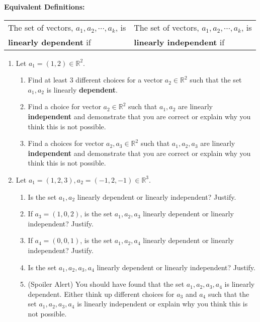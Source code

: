 \documentclass[11pt,fleqn]{article}
\begin{document}
\vfill

\noindent\textbf{Equivalent Definitions:}\\

\noindent\begin{tabularx}{\textwidth}{XX}
The set of vectors, $a_1,a_2, \cdots, a_k$, is 
& 
The set of vectors, $a_1,a_2, \cdots, a_k$, is \\
 \textbf{linearly dependent} if
 &
 \textbf{linearly independent} if\\
\end{tabularx}
\vspace{1in}
\newpage
\begin{enumerate}
\item Let $a_1=(1,2) \in \mathbb{R}^2.$
	\begin{enumerate}
	\item Find at least 3 different choices for a vector $a_2 \in \mathbb{R}^2$ such that the set $a_1,a_2$ is linearly \textbf{dependent}.
	\vfill
	\item Find a choice for vector $a_2 \in \mathbb{R}^2$ such that $a_1,a_2$ are linearly \textbf{independent} and demonstrate that you are correct or explain why you think this is not possible.
	\vfill
	\item Find a choices for vector $a_2,a_3 \in \mathbb{R}^2$ such that $a_1,a_2,a_3$ are linearly \textbf{independent} and demonstrate that you are correct or explain why you think this is not possible.
	\vfill
	\end{enumerate}
\item Let $a_1=(1,2,3), a_2=(-1,2,-1) \in \mathbb{R}^3.$
	\begin{enumerate}
	\item Is the set $a_1,a_2$ linearly dependent or linearly independent? Justify.
	\vfill
	\item If $a_3=(1,0,2)$, is the set $a_1,a_2,a_3$ linearly dependent or linearly independent? Justify.
	\vfill
	\newpage
	\item If $a_4=(0,0,1)$, is the set $a_1,a_2,a_4$ linearly dependent or linearly independent? Justify.
	\vfill
	\item Is the set $a_1,a_2,a_3,a_4$ linearly dependent or linearly independent? Justify.
	\vfill
	\item (Spoiler Alert) You should have found that the set $a_1,a_2,a_3,a_4$ is linearly dependent. Either think up different choices for $a_3$ and $a_4$ such that the set $a_1,a_2,a_3,a_4$ is linearly independent or explain why you think this is not possible.
	\vfill
	\end{enumerate}

\end{enumerate}
\end{document}

